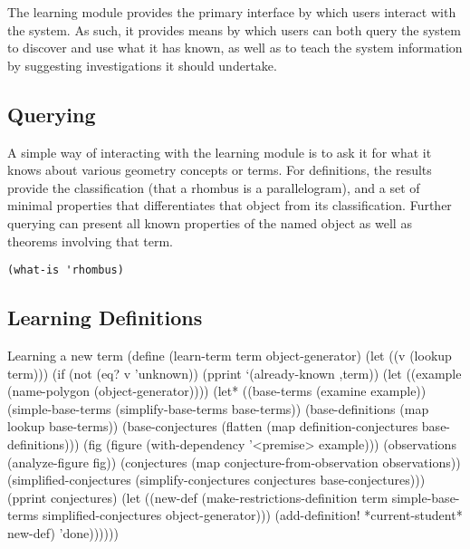 The learning module provides the primary interface by which users
interact with the system. As such, it provides means by which users
can both query the system to discover and use what it has known, as
well as to teach the system information by suggesting investigations
it should undertake.

\subsection{Querying}

A simple way of interacting with the learning module is to ask it for
what it knows about various geometry concepts or terms. For
definitions, the results provide the classification (that a rhombus is
a parallelogram), and a set of minimal properties that differentiates
that object from its classification. Further querying can present all
known properties of the named object as well as theorems involving
that term.

\begin{verbatim}
(what-is 'rhombus)
\end{verbatim}

\subsection{Learning Definitions}

\begin{code-listing}{Learning a new term}
(define (learn-term term object-generator)
  (let ((v (lookup term)))
    (if (not (eq? v 'unknown))
        (pprint `(already-known ,term))
        (let ((example (name-polygon (object-generator))))
          (let* ((base-terms (examine example))
                 (simple-base-terms (simplify-base-terms base-terms))
                 (base-definitions (map lookup base-terms))
                 (base-conjectures (flatten (map definition-conjectures
                                                 base-definitions)))
                 (fig (figure (with-dependency '<premise> example)))
                 (observations (analyze-figure fig))
                 (conjectures (map conjecture-from-observation observations))
                 (simplified-conjectures
                  (simplify-conjectures conjectures base-conjectures)))
            (pprint conjectures)
            (let ((new-def
                   (make-restrictions-definition
                    term
                    simple-base-terms
                    simplified-conjectures
                    object-generator)))
              (add-definition! *current-student* new-def)
              'done))))))
\end{code-listing}

